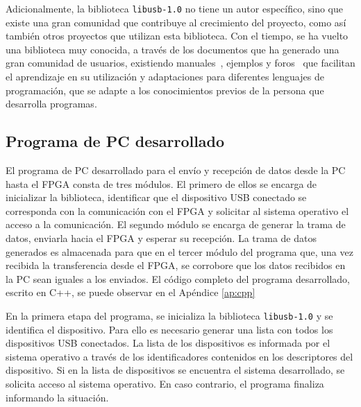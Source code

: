 	Adicionalmente, la biblioteca \verb|libusb-1.0| no tiene un autor específico, sino que existe una gran comunidad que contribuye al crecimiento del proyecto, como así también otros proyectos que utilizan esta biblioteca. Con el tiempo, se ha vuelto una biblioteca muy conocida, a través de los documentos que ha generado una gran comunidad de usuarios, existiendo manuales~\cite{libusb}, ejemplos y foros~\cite{ThePersianCoder2010} que facilitan el aprendizaje en su utilización y adaptaciones para diferentes lenguajes de programación, que se adapte a los conocimientos previos de la persona que desarrolla programas.

\subsection{Programa de PC desarrollado}
	El programa de PC desarrollado para el envío y recepción de datos desde la PC hasta el FPGA consta de tres módulos. El primero de ellos se encarga de inicializar la biblioteca, identificar que el dispositivo USB conectado se corresponda con la comunicación con el FPGA y solicitar al sistema operativo el acceso a la comunicación.
	El segundo módulo se encarga de generar la trama de datos, enviarla hacia el FPGA y esperar su recepción. La trama de datos generados es almacenada para que en el tercer módulo del programa que, una vez recibida la transferencia desde el FPGA, se corrobore que los datos recibidos en la PC sean iguales a los enviados. El código completo del programa desarrollado, escrito en C++, se puede observar en el Apéndice \ref{ap:cpp}
	
	En la primera etapa del programa, se inicializa la biblioteca \verb|libusb-1.0| y se identifica el dispositivo. Para ello es necesario generar una lista con todos los dispositivos USB conectados.
	La lista de los dispositivos es informada por el sistema operativo a través de los identificadores contenidos en los descriptores del dispositivo. Si en la lista de dispositivos se encuentra el sistema desarrollado, se solicita acceso al sistema operativo. En caso contrario, el programa finaliza informando la situación.
	
